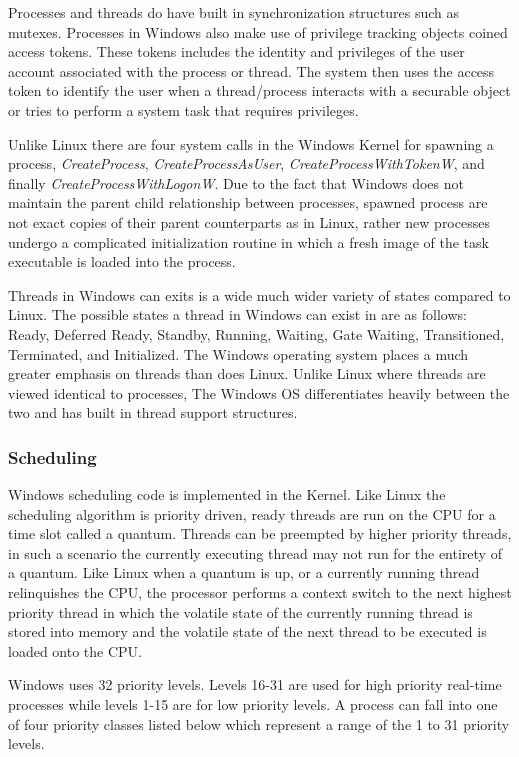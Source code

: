   \normalfont \indent Processes and threads do have built in synchronization structures such as mutexes. Processes in Windows also make use of privilege tracking objects coined access tokens. These tokens includes the identity and privileges of the user account associated with the process or thread.  The system then uses the access token to identify the user when a thread/process interacts with a securable object or tries to perform a system task that requires privileges.

\normalfont \indent Unlike Linux there are four system calls in the Windows Kernel for spawning a process, \textit{CreateProcess}, \textit{CreateProcessAsUser}, \textit{CreateProcessWithTokenW}, and finally \textit{CreateProcessWithLogonW}.  Due to the fact that Windows does not maintain the parent child relationship between processes, spawned process are not exact copies of their parent counterparts as in Linux, rather new processes undergo a complicated initialization routine in which a fresh image of the task executable is loaded into the process. 

  \normalfont \indent Threads in Windows can exits is a wide much wider variety of states compared to Linux. The possible states a thread in Windows can exist in are as follows: Ready, Deferred Ready, Standby, Running, Waiting, Gate Waiting, Transitioned, Terminated, and Initialized. The Windows operating system places a much greater emphasis on threads than does Linux. Unlike Linux where threads are viewed identical to processes, The Windows OS differentiates heavily between the two and has built in thread support structures.

  \subsubsection{\bf Scheduling}
  \normalfont \indent Windows scheduling code is implemented in the Kernel. Like Linux the scheduling algorithm is priority driven, ready threads are run on the CPU for a time slot called a quantum.  Threads can be preempted by higher priority threads, in such a scenario the currently executing thread may not run for the entirety of a quantum. Like Linux when a quantum is up, or a currently running thread relinquishes the CPU, the processor performs a context switch to the next highest priority thread in which the volatile state of the currently running thread is stored into memory and the volatile state of the next thread to be executed is loaded onto the CPU.

  \normalfont \indent Windows uses 32 priority levels. Levels 16-31 are used for high priority real-time processes while levels 1-15 are for low priority levels. A process can fall into one of four priority classes listed below which represent a range of the 1 to 31 priority levels\cite{windowsInternals}.

